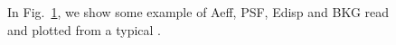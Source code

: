 \begin{figure}

	\caption{In Fig.~\ref{ig*:minted:irf_examples}, we show some example of Aeff,
		PSF, Edisp and BKG read and plotted from a typical \irf.}
	\label{ig*:minted:irf_examples} \end{figure}

